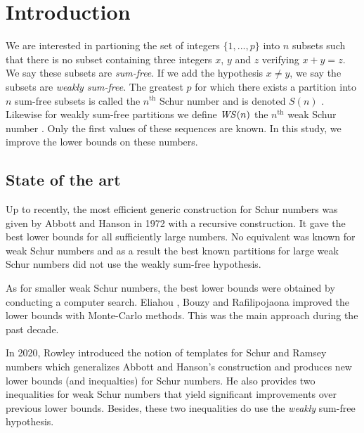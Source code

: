 \section{Introduction}

\qquad We are interested in partioning the set of integers \(\{1, ..., p\}\) into \(n\) subsets such that there is no 
subset containing three integers \(x\), \(y\) and \(z\) verifying \(x + y = z\). We say these subsets are 
\textit{sum-free}. If we add the hypothesis \(x \neq y\), we say the subsets are \textit{weakly sum-free}. The 
greatest \(p\) for which there exists a partition into \(n\) sum-free subsets is called the \(n^{\text{th}}\) Schur 
number and is denoted \(S(n)\) \cite{Schur1917}. Likewise for weakly sum-free partitions we define \(\mathit{WS}(n)\) 
the \(n^{\text{th}}\) weak Schur number \cite{Irving1973}. Only the first values of these sequences are known. 
In this study, we improve the lower bounds on these numbers.


\subsection{State of the art}

\qquad Up to recently, the most efficient generic construction for Schur numbers was given by Abbott and Hanson 
\cite{AbbottHanson} in 1972 with a recursive construction. It gave the best lower bounds for all sufficiently large 
numbers. No equivalent was known for weak Schur numbers and as a result the best known partitions for large 
weak Schur numbers did not use the weakly sum-free hypothesis. 

\par
As for smaller weak Schur numbers, the best lower bounds were obtained by conducting a computer search. Eliahou 
\cite{EliahouBook}, Bouzy \cite{Bouzy2015AnAP} and Rafilipojaona \cite{Rafilipojaona} improved the lower 
bounds with Monte-Carlo methods. This was the main approach during the past decade.

\par
In 2020, Rowley introduced the notion of templates for Schur and Ramsey numbers \cite{RowleyRamsey} which 
generalizes Abbott and Hanson's construction and produces new lower bounds (and inequalties) for Schur numbers. 
He also provides two inequalities for weak Schur numbers \cite{RowleyWS} that yield significant improvements 
over previous lower bounds. Besides, these two inequalities do use the \textit{weakly} sum-free hypothesis.

\setlength{\tabcolsep}{4pt}


